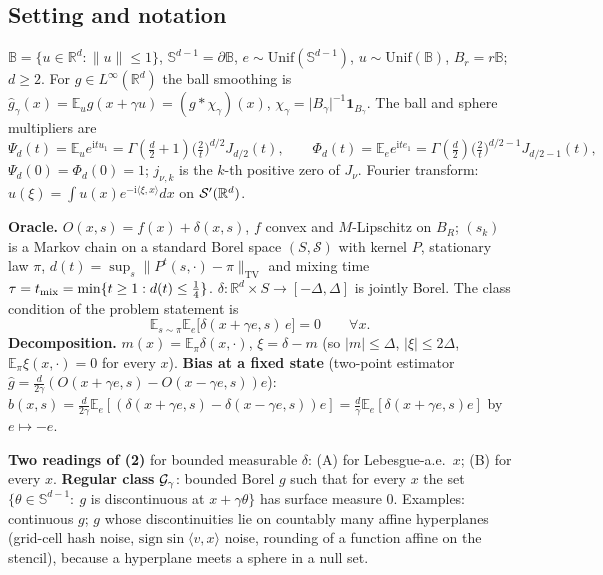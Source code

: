 \documentclass[11pt,a4paper]{article}
\numberwithin{equation}{section}
\theoremstyle{definition}
\theoremstyle{remark}
\newcommand{\E}{\mathbb E}\newcommand{\R}{\mathbb R}\newcommand{\N}{\mathbb N}\newcommand{\Prob}{\mathbb P}
\newcommand{\norm}[1]{\lVert #1\rVert}\newcommand{\abs}[1]{\lvert #1\rvert}\newcommand{\ip}[2]{\langle #1,#2\rangle}
\newcommand{\Unif}{\mathrm{Unif}}\newcommand{\TV}{\mathrm{TV}}\newcommand{\tmix}{t_{\rm mix}}
\newcommand{\Sph}{\mathbb S^{d-1}}\newcommand{\Ball}{\mathbb B}
\begin{document}
\subsection{Setting and notation}
$\Ball=\{u\in\R^d:\norm u\le1\}$, $\Sph=\partial\Ball$, $e\sim\Unif(\Sph)$, $u\sim\Unif(\Ball)$, $B_r=r\Ball$; $d\ge2$.
For $g\in L^\infty(\R^d)$ the ball smoothing is $\hat g_\gamma(x)=\E_u g(x+\gamma u)=(g*\chi_\gamma)(x)$, $\chi_\gamma=\abs{B_\gamma}^{-1}\mathbf 1_{B_\gamma}$.
The ball and sphere multipliers are
\begin{equation}\label{eq:Psi}
\Psi_d(t)=\E_u e^{\mathrm i t u_1}=\Gamma(\tfrac d2+1)\big(\tfrac2t\big)^{d/2}J_{d/2}(t),\qquad
\Phi_d(t)=\E_e e^{\mathrm i t e_1}=\Gamma(\tfrac d2)\big(\tfrac2t\big)^{d/2-1}J_{d/2-1}(t),
\end{equation}
$\Psi_d(0)=\Phi_d(0)=1$; $j_{\nu,k}$ is the $k$-th positive zero of $J_\nu$. Fourier transform: $\hat u(\xi)=\int u(x)e^{-\mathrm i\ip\xi x}dx$ on $\cS'(\R^d)$.

\textbf{Oracle.} $O(x,s)=f(x)+\delta(x,s)$, $f$ convex and $M$-Lipschitz on $B_R$; $(s_k)$ is a Markov chain on a standard Borel space $(S,\mathcal S)$ with kernel $P$, stationary law $\pi$,
$d(t)=\sup_{s}\norm{P^t(s,\cdot)-\pi}_\TV$ and mixing time $\tau=\tmix=\min\{t\ge1:d(t)\le\frac14\}$.
$\delta:\R^d\times S\to[-\Delta,\Delta]$ is jointly Borel. The class condition of the problem statement is
\begin{equation}\label{eq:orth}
\E_{s\sim\pi}\E_e\big[\delta(x+\gamma e,s)\,e\big]=0\qquad\forall x. \tag{2}
\end{equation}
\textbf{Decomposition.} $m(x)=\E_\pi\delta(x,\cdot)$, $\xi=\delta-m$ (so $\abs m\le\Delta$, $\abs\xi\le2\Delta$, $\E_\pi\xi(x,\cdot)=0$ for every $x$).
\textbf{Bias at a fixed state} (two-point estimator $\hat g=\frac d{2\gamma}(O(x+\gamma e,s)-O(x-\gamma e,s))e$):
$b(x,s)=\frac d{2\gamma}\E_e[(\delta(x+\gamma e,s)-\delta(x-\gamma e,s))e]=\frac d\gamma\E_e[\delta(x+\gamma e,s)e]$ by $e\mapsto-e$.

\textbf{Two readings of (2)} for bounded measurable $\delta$: (A) for Lebesgue-a.e.\ $x$; (B) for every $x$.
\textbf{Regular class} $\mathcal G_\gamma$: bounded Borel $g$ such that for every $x$ the set $\{\theta\in\Sph:\ g$ is discontinuous at $x+\gamma\theta\}$ has surface measure $0$.
Examples: continuous $g$; $g$ whose discontinuities lie on countably many affine hyperplanes (grid-cell hash noise, $\mathrm{sign}\sin\ip vx$ noise, rounding of a function affine on the stencil), because a hyperplane meets a sphere in a null set.
\end{document}
